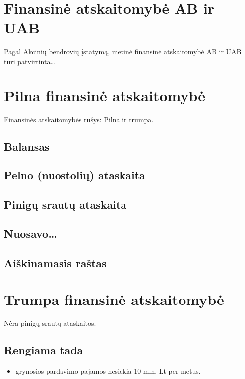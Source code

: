 \section{Finansinė atskaitomybė AB ir UAB}

Pagal Akcinių bendrovių įstatymą, metinė finansinė atskaitomybė AB
ir UAB turi patvirtinta…

\section{Pilna finansinė atskaitomybė}

Finansinės atskaitomybės rūšys: Pilna ir trumpa.

\subsection{Balansas}

\subsection{Pelno (nuostolių) ataskaita}

\subsection{Pinigų srautų ataskaita}

\subsection{Nuosavo…}

\subsection{Aiškinamasis raštas}

\section{Trumpa finansinė atskaitomybė}

Nėra pinigų srautų ataskaitos.

\subsection{Rengiama tada}

\begin{itemize}
  \item grynosios pardavimo pajamos nesiekia 10 mln. Lt per metus.
\end{itemize}

